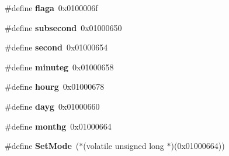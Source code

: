 \begin{DoxyCompactItemize}
\mbox{\label{a00017_a7ef4ab11dcfd29d3883045081f7ceaa9}} 
\#define {\bfseries flaga}~0x0100006f
\item 
\mbox{\label{a00017_a81cdf7492bd03dd6526dd3808283039c}} 
\#define {\bfseries subsecond}~0x01000650
\item 
\mbox{\label{a00017_abc2d9013938c4fcdc5beeac9af26ea57}} 
\#define {\bfseries second}~0x01000654
\item 
\mbox{\label{a00017_a1ae1e452465d6d5e7956d025a0c58fc7}} 
\#define {\bfseries minuteg}~0x01000658
\item 
\mbox{\label{a00017_a7ddf2f22375dcadda0c720c6946dde76}} 
\#define {\bfseries hourg}~0x01000678
\item 
\mbox{\label{a00017_a1e69b7c99eee653dc9de64a52a588066}} 
\#define {\bfseries dayg}~0x01000660
\item 
\mbox{\label{a00017_a17d21720d847cc096e0c0f9ce0755bd4}} 
\#define {\bfseries monthg}~0x01000664
\item 
\mbox{\label{a00017_a853261722f6a38804e9fe7ff43f83261}} 
\#define {\bfseries Set\+Mode}~($\ast$(volatile unsigned long $\ast$)(0x01000664))
\end{DoxyCompactItemize}
